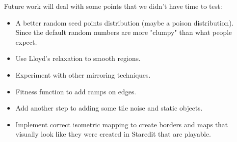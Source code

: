\documentclass[letterpaper]{article}
\begin{document}
Future work will deal with some points that we didn't have time to test:
\begin{itemize}
	\item A better random seed points distribution (maybe a poison distribution). Since the default random numbers are more "clumpy" than what people expect.
	\item Use Lloyd's relaxation to smooth regions.
	\item Experiment with other mirroring techniques.
	\item Fitness function to add ramps on edges.
	\item Add another step to adding some tile noise and static objects.
	\item Implement correct isometric mapping to create borders and maps that visually look like they were created in Staredit that are playable.
\end{itemize}





\end{document}
